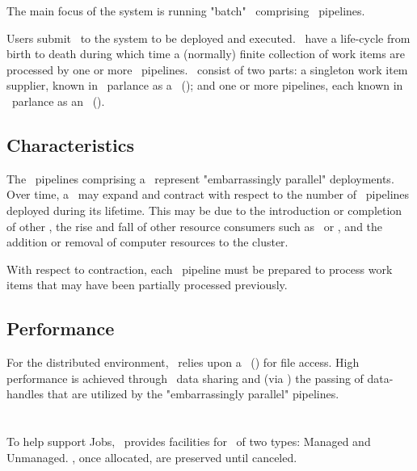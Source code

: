     The main focus of the system is running "batch" \varJobs~comprising \varUIMA~pipelines.
    
    Users submit \varJobs~to the system to be deployed and executed. \varJobs~have a
    life-cycle from birth to death during which time a (normally) finite collection of
    work items are processed by one or more \varUIMA~pipelines. \varJobs~consist of two
    parts: a singleton work item supplier, known in \varUIMA~parlance as a
    \varCollectionReader~(\varCR); and one or more pipelines, each known in \varUIMA~parlance
    as an \varAnalysisEngine~(\varAE).
        
    \subsection{Characteristics}   
    
    The \varUIMA~pipelines comprising a \varJob~represent "embarrassingly parallel" 
    deployments. Over time, a \varJob~may expand and contract with respect to the number of 
    \varUIMA~pipelines deployed during its lifetime. This may be due to the introduction 
    or completion of other \varJobs, the rise and fall of other resource consumers such 
    as \varReservations~or \varServices, and the addition or removal of computer resources 
    to the cluster.
    
    With respect to contraction, each \varUIMA~pipeline must be prepared to
    process work items that may have been partially processed previously.
       
    \subsection{Performance}  
    
    For the distributed environment, \varDUCC~relies upon a \varNetworkFileSystem~(\varNFS)
    for file access.
    High performance is achieved through \varNFS~data sharing and (via \varActiveMQ) the passing of
    data-handles that are utilized by the "embarrassingly parallel" pipelines.
    
    \section{\varReservations}
    
    To help support Jobs, \varDUCC~provides facilities for \varReservations~of two types: 
    Managed and Unmanaged. \varReservations, once allocated, are preserved until 
    canceled. 
    
